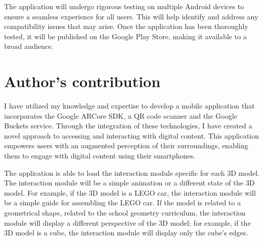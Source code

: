 The application will undergo rigorous testing on multiple Android devices to ensure a seamless experience for all users. This will help identify and address any compatibility issues that may arise. Once the application has been thoroughly tested, it will be published on the Google Play Store, making it available to a broad audience.

\newpage
\section{Author's contribution}
I have utilized my knowledge and expertise to develop a mobile application that incorporates the Google ARCore \ac{SDK}, a \ac{QR} code scanner and the Google Buckets service. Through the integration of these technologies, I have created a novel approach to accessing and interacting with digital content. This application empowers users with an augmented perception of their surroundings, enabling them to engage with digital content using their smartphones.


The application is able to load the interaction module specific for each \ac{3D} model. The interaction module will be a simple animation or a different state of the \ac{3D} model. For example, if the \ac{3D} model is a LEGO car, the interaction module will be a simple guide for assembling the LEGO car. If the model is related to a geometrical shape, related to the school geometry curriculum, the interaction module will display a different perspective of the \ac{3D} model; for example, if the \ac{3D} model is a cube, the interaction module will display only the cube's edges.



